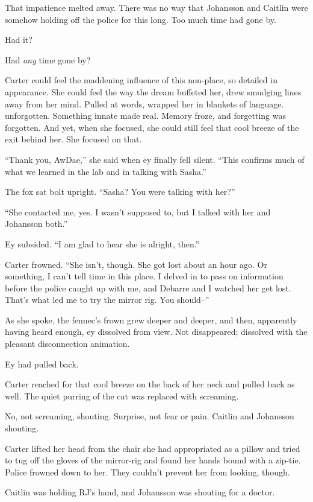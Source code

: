 That impatience melted away. There was no way that Johansson and Caitlin were somehow holding off the police for this long. Too much time had gone by.

Had it?

Had \emph{any} time gone by?

Carter could feel the maddening influence of this non-place, so detailed in appearance. She could feel the way the dream buffeted her, drew smudging lines away from her mind. Pulled at words, wrapped her in blankets of language. unforgotten. Something innate made real. Memory froze, and forgetting was forgotten. And yet, when she focused, she could still feel that cool breeze of the exit behind her. She focused on that.

``Thank you, AwDae,'' she said when ey finally fell silent. ``This confirms much of what we learned in the lab and in talking with Sasha.''

The fox sat bolt upright. ``Sasha? You were talking with her?''

``She contacted me, yes. I wasn't supposed to, but I talked with her and Johansson both.''

Ey subsided. ``I am glad to hear she is alright, then.''

Carter frowned. ``She isn't, though. She got lost about an hour ago. Or something, I can't tell time in this place. I delved in to pass on information before the police caught up with me, and Debarre and I watched her get lost. That's what led me to try the mirror rig. You should--''

As she spoke, the fennec's frown grew deeper and deeper, and then, apparently having heard enough, ey dissolved from view. Not disappeared; dissolved with the pleasant disconnection animation.

Ey had pulled back.

Carter reached for that cool breeze on the back of her neck and pulled back as well. The quiet purring of the cat was replaced with screaming.

No, not screaming, shouting. Surprise, not fear or pain. Caitlin and Johansson shouting.

Carter lifted her head from the chair she had appropriated as a pillow and tried to tug off the gloves of the mirror-rig and found her hands bound with a zip-tie. Police frowned down to her. They couldn't prevent her from looking, though.

Caitlin was holding RJ's hand, and Johansson was shouting for a doctor.

